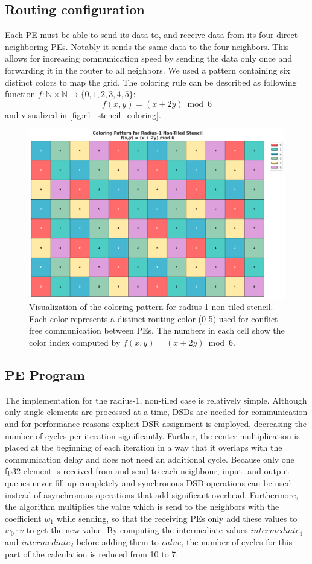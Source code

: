 \subsection{Routing configuration}
Each PE must be able to send its data to, and receive data from its four direct neighboring PEs. Notably it sends the same data to the four neighbors. This allows for increasing communication speed by sending the data only once and forwarding it in the router to all neighbors. We used a pattern containing six distinct colors to map the grid.
The coloring rule can be described as following function $f:\mathbb{N}\times\mathbb{N}\to\{0,1,2,3,4,5\}$:
\begin{equation}
    \label{eq:coloring_function}
    f(x,y) = (x + 2y) \bmod 6
\end{equation}
and visualized in \autoref{fig:r1_stencil_coloring}.
\begin{figure}
    \centering
    \includegraphics[width=0.5\linewidth]{plots/r1-stencil-coloring.png}
    \caption{Visualization of the coloring pattern for radius-1 non-tiled stencil. Each color represents a distinct routing color (0-5) used for conflict-free communication between PEs. The numbers in each cell show the color index computed by $f(x,y) = (x + 2y) \bmod 6$.}
    \label{fig:r1_stencil_coloring}
\end{figure}

\subsection{PE Program}
The implementation for the radius-1, non-tiled case is relatively simple.
Although only single elements are processed at a time, DSDs are needed for communication and for performance reasons explicit DSR assignment is employed, decreasing the number of cycles per iteration significantly.  
Further, the center multiplication is placed at the beginning of each iteration in a way that it overlaps with the communication delay and does not need an additional cycle.
Because only one fp32 element is received from and send to each neighbour, input- and output- queues never fill up completely and synchronous DSD operations can be used instead of asynchronous operations that add significant overhead.
Furthermore, the algorithm multiplies the value which is send to the neighbors with the coefficient $w_1$ while sending, so that the receiving PEs only add these values to $w_0 \cdot v$ to get the new value.
By computing the intermediate values $intermediate_1$ and $intermediate_2$ before adding them to $value$, the number of cycles for this part of the calculation is reduced from 10 to 7.

